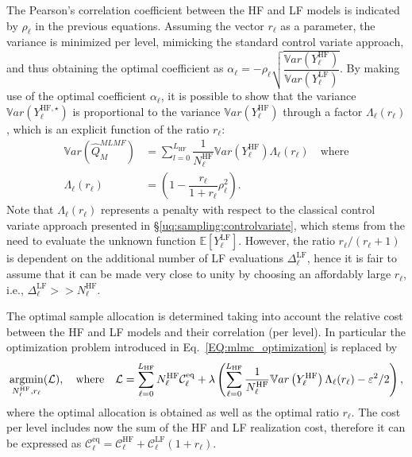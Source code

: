 The Pearson's correlation coefficient between the HF and LF models is indicated by $\rho_\ell$ in the previous equations.
Assuming the vector $r_\ell$ as a parameter, the variance is minimized per level, mimicking the standard control variate 
approach, and thus obtaining the optimal coefficient as 
$\alpha_\ell = -\rho_\ell \sqrt{ \dfrac{ \mathbb{V}ar\left( Y^{\mathrm{HF}}_{\ell} \right) } 
                                { \mathbb{V}ar\left( Y^{\mathrm{LF}}_{\ell}  \right)     }}$. 
By making use of the optimal coefficient $\alpha_\ell$, it is possible to show that the variance $\mathbb{V}ar\left(Y^{\mathrm{HF},\star}_{\ell}\right)$ 
is proportional to the variance $\mathbb{V}ar\left(Y^{\mathrm{HF}}_{\ell}\right)$ through a factor $\Lambda_{\ell}(r_\ell)$, which is an explicit 
function of the ratio $r_\ell$:
\begin{equation}\label{EQ: MLMF variance}
\begin{split}
 \mathbb{V}ar\left(\hat{Q}_M^{MLMF}\right) &= \sum_{l=0}^{L_{\mathrm{HF}}} \dfrac{1}{N_{\ell}^{\mathrm{HF}}} \mathbb{V}ar\left(Y^{\mathrm{HF}}_{\ell}\right)
 \Lambda_{\ell}(r_\ell) \quad \mathrm{where} \\
 \Lambda_{\ell}(r_\ell) &= \left( 1 - \dfrac{r_\ell}{1+r_\ell}\rho_\ell^2 \right).
\end{split}
\end{equation}
Note that $\Lambda_{\ell}(r_\ell)$ represents a penalty with respect to the classical 
control variate approach presented in \S\ref{uq:sampling:controlvariate}, which stems from 
the need to evaluate the unknown function $\mathbb{E}\left[Y^{\mathrm{LF}}_{\ell}\right]$. However, the ratio $r_\ell/(r_\ell+1)$ is dependent 
on the additional number of LF evaluations $\Delta_{\ell}^{\mathrm{LF}}$, hence it is fair to assume that it 
can be made very close to unity by choosing an affordably large $r_\ell$, i.e., $\Delta_{\ell}^{\mathrm{LF}} >> N_{\ell}^{\mathrm{HF}}$.

The optimal sample allocation is determined taking into account the relative cost between the HF and LF models and their correlation (per level).
In particular the optimization problem introduced in Eq.~\eqref{EQ:mlmc_optimization} is replaced by
 \begin{equation*}
  \operatornamewithlimits{argmin}\limits_{N_{\ell}^{\mathrm{HF}}, r_\ell}(\mathcal{L}), \quad \mathrm{where} \quad \mathcal{L} = \sum_{\ell=0}^{L_{\mathrm{HF}}} N_{\ell}^{\mathrm{HF}} \mathcal{C}_{\ell}^{\mathrm{eq}} +
                 \lambda \left( \sum_{\ell=0}^{L_{\mathrm{HF}}} \dfrac{1}{N_{\ell}^{\mathrm{HF}}}\mathbb{V}ar\left( Y^{\mathrm{HF}}_{\ell}\right) \Lambda_{\ell}(r_\ell) - \varepsilon^2/2 \right),
 \end{equation*}
where the optimal allocation is obtained as well as the optimal ratio $r_\ell$. The cost per level includes now the sum of the HF and LF realization cost,
therefore it can be expressed as $\mathcal{C}_{\ell}^{\mathrm{eq}} = \mathcal{C}_{\ell}^{\mathrm{HF}} + \mathcal{C}_{\ell}^{\mathrm{LF}} (1+r_\ell)$.

